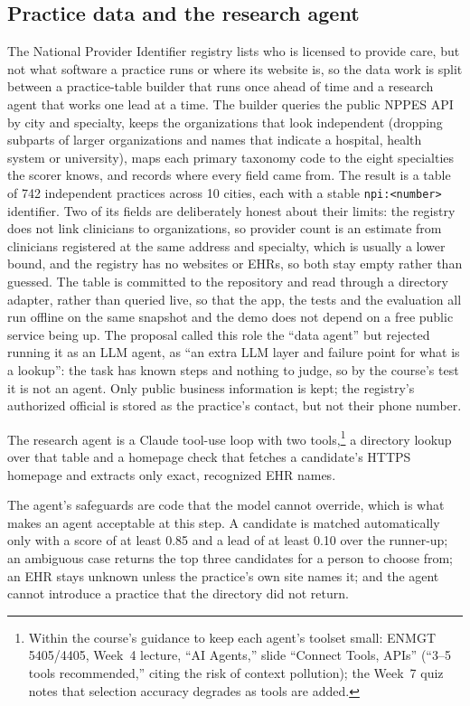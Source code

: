 \documentclass[11pt]{article}
\newcommand{\code}[1]{\texttt{\small #1}}
\begin{document}
\subsection{Practice data and the research agent}

The National Provider Identifier registry lists who is licensed to provide care, but not what software a practice runs or where its website is, so the data work is split between a practice-table builder that runs once ahead of time and a research agent that works one lead at a time. The builder queries the public NPPES API by city and specialty, keeps the organizations that look independent (dropping subparts of larger organizations and names that indicate a hospital, health system or university), maps each primary taxonomy code to the eight specialties the scorer knows, and records where every field came from. The result is a table of 742 independent practices across 10 cities, each with a stable \code{npi:<number>} identifier. Two of its fields are deliberately honest about their limits: the registry does not link clinicians to organizations, so provider count is an estimate from clinicians registered at the same address and specialty, which is usually a lower bound, and the registry has no websites or EHRs, so both stay empty rather than guessed. The table is committed to the repository and read through a directory adapter, rather than queried live, so that the app, the tests and the evaluation all run offline on the same snapshot and the demo does not depend on a free public service being up. The proposal called this role the ``data agent'' but rejected running it as an LLM agent, as ``an extra LLM layer and failure point for what is a lookup'': the task has known steps and nothing to judge, so by the course's test it is not an agent. Only public business information is kept; the registry's authorized official is stored as the practice's contact, but not their phone number.

The research agent is a Claude tool-use loop with two tools,\footnote{Within the course's guidance to keep each agent's toolset small: ENMGT 5405/4405, Week~4 lecture, ``AI Agents,'' slide ``Connect Tools, APIs'' (``3--5 tools recommended,'' citing the risk of context pollution); the Week~7 quiz notes that selection accuracy degrades as tools are added.} a directory lookup over that table and a homepage check that fetches a candidate's HTTPS homepage and extracts only exact, recognized EHR names.

The agent's safeguards are code that the model cannot override, which is what makes an agent acceptable at this step. A candidate is matched automatically only with a score of at least 0.85 and a lead of at least 0.10 over the runner-up; an ambiguous case returns the top three candidates for a person to choose from; an EHR stays unknown unless the practice's own site names it; and the agent cannot introduce a practice that the directory did not return.
\end{document}
